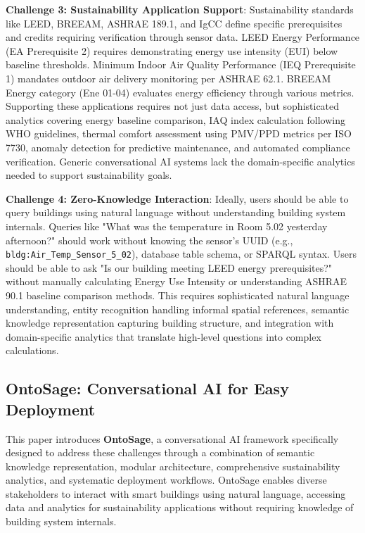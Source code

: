 \documentclass[acmlarge]{acmart}
\begin{document}
\textbf{Challenge 3: Sustainability Application Support}: Sustainability standards like LEED, BREEAM, ASHRAE 189.1, and IgCC define specific prerequisites and credits requiring verification through sensor data. LEED Energy Performance (EA Prerequisite 2) requires demonstrating energy use intensity (EUI) below baseline thresholds. Minimum Indoor Air Quality Performance (IEQ Prerequisite 1) mandates outdoor air delivery monitoring per ASHRAE 62.1. BREEAM Energy category (Ene 01-04) evaluates energy efficiency through various metrics. Supporting these applications requires not just data access, but sophisticated analytics covering energy baseline comparison, IAQ index calculation following WHO guidelines, thermal comfort assessment using PMV/PPD metrics per ISO 7730, anomaly detection for predictive maintenance, and automated compliance verification. Generic conversational AI systems lack the domain-specific analytics needed to support sustainability goals.

\textbf{Challenge 4: Zero-Knowledge Interaction}: Ideally, users should be able to query buildings using natural language without understanding building system internals. Queries like "What was the temperature in Room 5.02 yesterday afternoon?" should work without knowing the sensor's UUID (e.g., \texttt{bldg:Air\_Temp\_Sensor\_5\_02}), database table schema, or SPARQL syntax. Users should be able to ask "Is our building meeting LEED energy prerequisites?" without manually calculating Energy Use Intensity or understanding ASHRAE 90.1 baseline comparison methods. This requires sophisticated natural language understanding, entity recognition handling informal spatial references, semantic knowledge representation capturing building structure, and integration with domain-specific analytics that translate high-level questions into complex calculations.


\subsection{OntoSage: Conversational AI for Easy Deployment}

This paper introduces \textbf{OntoSage}, a conversational AI framework specifically designed to address these challenges through a combination of semantic knowledge representation, modular architecture, comprehensive sustainability analytics, and systematic deployment workflows. OntoSage enables diverse stakeholders to interact with smart buildings using natural language, accessing data and analytics for sustainability applications without requiring knowledge of building system internals.
\end{document}
